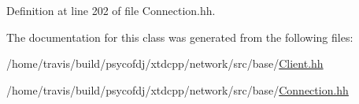Definition at line 202 of file Connection.\-hh.



The documentation for this class was generated from the following files\-:\begin{DoxyCompactItemize}
\item 
/home/travis/build/psycofdj/xtdcpp/network/src/base/\hyperlink{base_2Client_8hh}{Client.\-hh}\item 
/home/travis/build/psycofdj/xtdcpp/network/src/base/\hyperlink{base_2Connection_8hh}{Connection.\-hh}\end{DoxyCompactItemize}

